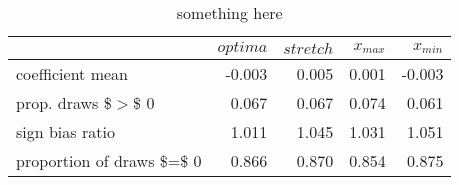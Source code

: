 \begin{table}[ht]
\centering
\begin{tabular}{lrrrr}
  \hline
  & $optima$ & $stretch$ & $x_{max}$ & $x_{min}$ \\ 
  \hline
coefficient mean & -0.003 & 0.005 & 0.001 & -0.003 \\ 
  prop. draws \$$>$\$ 0 & 0.067 & 0.067 & 0.074 & 0.061 \\ 
  sign bias ratio & 1.011 & 1.045 & 1.031 & 1.051 \\ 
  proportion of draws \$=\$ 0 & 0.866 & 0.870 & 0.854 & 0.875 \\ 
   \hline
\end{tabular}
\caption{something here} 
\end{table}
